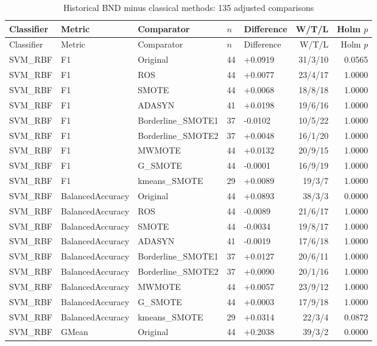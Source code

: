 \documentclass[10pt,a4paper]{article}
\begin{document}
\begingroup\small\setlength{\tabcolsep}{4pt}
\begin{longtable}{lllllrr}
\caption{Historical BND minus classical methods: 135 adjusted comparisons}\label{tab:s5}\\
\toprule
Classifier & Metric & Comparator & $n$ & Difference & W/T/L & Holm $p$ \\
\midrule
\endfirsthead
\toprule
Classifier & Metric & Comparator & $n$ & Difference & W/T/L & Holm $p$ \\
\midrule
\endhead
\bottomrule
\endlastfoot
SVM\_RBF & F1 & Original & 44 & +0.0919 & 31/3/10 & 0.0565 \\
SVM\_RBF & F1 & ROS & 44 & +0.0077 & 23/4/17 & 1.0000 \\
SVM\_RBF & F1 & SMOTE & 44 & +0.0068 & 18/8/18 & 1.0000 \\
SVM\_RBF & F1 & ADASYN & 41 & +0.0198 & 19/6/16 & 1.0000 \\
SVM\_RBF & F1 & Borderline\_SMOTE1 & 37 & -0.0102 & 10/5/22 & 1.0000 \\
SVM\_RBF & F1 & Borderline\_SMOTE2 & 37 & +0.0048 & 16/1/20 & 1.0000 \\
SVM\_RBF & F1 & MWMOTE & 44 & +0.0132 & 20/9/15 & 1.0000 \\
SVM\_RBF & F1 & G\_SMOTE & 44 & -0.0001 & 16/9/19 & 1.0000 \\
SVM\_RBF & F1 & kmeans\_SMOTE & 29 & +0.0089 & 19/3/7 & 1.0000 \\
SVM\_RBF & BalancedAccuracy & Original & 44 & +0.0893 & 38/3/3 & 0.0000 \\
SVM\_RBF & BalancedAccuracy & ROS & 44 & -0.0089 & 21/6/17 & 1.0000 \\
SVM\_RBF & BalancedAccuracy & SMOTE & 44 & -0.0034 & 19/8/17 & 1.0000 \\
SVM\_RBF & BalancedAccuracy & ADASYN & 41 & -0.0019 & 17/6/18 & 1.0000 \\
SVM\_RBF & BalancedAccuracy & Borderline\_SMOTE1 & 37 & +0.0127 & 20/6/11 & 1.0000 \\
SVM\_RBF & BalancedAccuracy & Borderline\_SMOTE2 & 37 & +0.0090 & 20/1/16 & 1.0000 \\
SVM\_RBF & BalancedAccuracy & MWMOTE & 44 & +0.0057 & 23/9/12 & 1.0000 \\
SVM\_RBF & BalancedAccuracy & G\_SMOTE & 44 & +0.0003 & 17/9/18 & 1.0000 \\
SVM\_RBF & BalancedAccuracy & kmeans\_SMOTE & 29 & +0.0314 & 22/3/4 & 0.0872 \\
SVM\_RBF & GMean & Original & 44 & +0.2038 & 39/3/2 & 0.0000 \\

\end{longtable}
\end{document}
